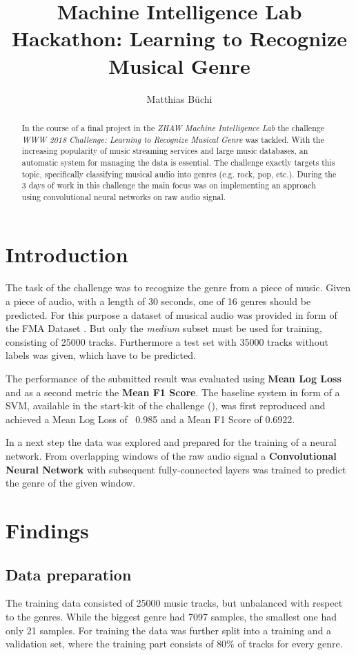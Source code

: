 \documentclass[11pt]{article}
\title{Machine Intelligence Lab Hackathon: Learning to Recognize Musical Genre}
\author{Matthias Büchi}
\begin{document}
\maketitle

\begin{abstract}
In the course of a final project in the \textit{ZHAW Machine Intelligence Lab} the challenge \textit{WWW 2018 Challenge: Learning to Recognize Musical Genre} was tackled. With the increasing popularity of music streaming services and large music databases, an automatic system for managing the data is essential. The challenge exactly targets this topic, specifically classifying musical audio into genres (e.g. rock, pop, etc.). During the 3 days of work in this challenge the main focus was on implementing an approach using convolutional neural networks on raw audio signal.
\end{abstract}

\section{Introduction}

The task of the challenge was to recognize the genre from a piece of music. Given a piece of audio, with a length of 30 seconds, one of 16 genres should be predicted. For this purpose a dataset of musical audio was provided in form of the FMA Dataset \cite{fma}. But only the \textit{medium} subset must be used for training, consisting of 25000 tracks. Furthermore a test set with 35000 tracks without labels was given, which have to be predicted.

The performance of the submitted result was evaluated using \textbf{Mean Log Loss} and as a second metric the \textbf{Mean F1 Score}. The baseline system in form of a SVM, available in the start-kit of the challenge (\cite{starterkit}), was first reproduced and achieved a Mean Log Loss of ~0.985 and a Mean F1 Score of 0.6922. 

In a next step the data was explored and prepared for the training of a neural network. From overlapping windows of the raw audio signal a \textbf{Convolutional Neural Network} with subsequent fully-connected layers was trained to predict the genre of the given window.

\section{Findings}

\subsection{Data preparation}
The training data consisted of 25000 music tracks, but unbalanced with respect to the genres. While the biggest genre had 7097 samples, the smallest one had only 21 samples. For training the data was further split into a training and a validation set, where the training part consists of 80\% of tracks for every genre.
\end{document}
